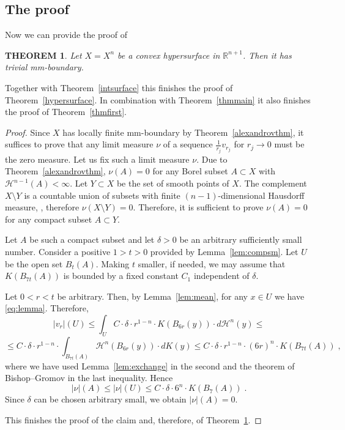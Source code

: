 \documentclass[12pt,leqno,intlimits]{amsart}
\numberwithin{equation}{section}
\newtheorem{thm}{THEOREM}[section]
\theoremstyle{definition}
\theoremstyle{remark}
\newcommand{\tref}[1]{Theorem~\ref{#1}}
\newcommand{\lref}[1]{Lemma~\ref{#1}}
\newcommand{\R}{\mathbb{R}}
\begin{document}
\subsection{The proof} Now we can provide the proof of
\begin{thm} \label{thmconv}
Let $X=X^n$ be a convex hypersurface in $\R^{n+1}$.  Then it has trivial mm-boundary.

\end{thm}
Together with \tref{intsurface} this finishes the proof of \tref{hypersurface}. In combination with \tref{thmmain} it also finishes the proof of \tref{thmfirst}.
\begin{proof}
 Since $X$ has locally finite mm-boundary by
\tref{alexandrovthm}, it suffices to prove that  any limit measure $\nu$ of a sequence $\frac 1 {r_j} v_{r_j}$ for $r_j\to 0$ must be the zero measure.
Let us fix such a limit measure $\nu$.  Due to \tref{alexandrovthm}, $\nu (A)=0$ for any Borel subset $A\subset X$ with $\mathcal H^{n-1} (A)<\infty$.
Let $Y\subset X$ be the set of smooth points of $X$.
The complement $X\setminus Y$ is a countable union of subsets with finite $(n-1)$-dimensional Hausdorff measure, \cite[Theorem 1.4]{Schneider}, therefore $\nu (X\setminus Y) =0$.   Therefore, it is sufficient to prove $\nu (A)=0$
for any compact subset $A\subset Y$.



Let $A$ be such a compact subset and  let $\delta>0$ be an arbitrary sufficiently small number. Consider a positive $1>t>0$ provided by \lref{lem:compsm}.  Let $U$ be the open set $B_t (A)$. Making $t$ smaller, if needed, we may assume that $K(B_{7t}(A))$ is bounded by a
 fixed constant $C_1$ independent of $\delta$.

 Let $0<r<t$ be arbitrary. Then, by \lref{lem:mean},  for any $x\in U$ we have \eqref{eq:lemma}.
Therefore, $$|v_r| (U)\leq \int _U   C\cdot \delta \cdot r^{1-n}\cdot  K (B_{6r} (y)) \cdot d\mathcal H^n (y) \leq  $$
 $$\leq C\cdot \delta \cdot  r^{1-n} \cdot \int _{B_{7t} (A)} \mathcal H^n (B_{6r} (y)) \cdot dK(y)  \leq C\cdot \delta \cdot  r^{1-n} \cdot (6r) ^n \cdot K(B_{7t} (A)) \;,  $$
where we have used \lref{lem:exchange} in the second and the theorem of Bishop--Gromov in the last inequality.  Hence
$$|\nu| (A) \leq |\nu| (U) \leq C\cdot \delta \cdot 6^n \cdot K(B_7 (A)) \;. $$
Since $\delta$ can be chosen arbitrary small, we obtain $|\nu| (A)=0$.

This finishes the proof of the claim and, therefore, of \tref{thmconv}.
\end{proof}
\end{document}
